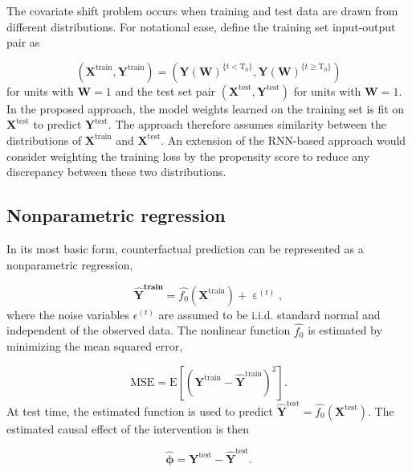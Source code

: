 \documentclass[hidelinks,12pt]{article}
\newcommand{\E}{\mathrm{E}}
\begin{document}
The covariate shift problem occurs when training and test data are drawn from different distributions. For notational ease, define the training set input-output pair as 

$$\left(\boldsymbol{X}^{\text{train}}, \boldsymbol{Y}^{\text{train}}\right) = \left(\boldsymbol{Y}(\boldsymbol{W})^{\{t < \text{T}_0\}}, \boldsymbol{Y}(\boldsymbol{W})^{\{t \geq \text{T}_0\}}\right)$$
\noindent
for units with $\boldsymbol{W}=1$ and the test set pair $\left(\boldsymbol{X}^{\text{test}}, \boldsymbol{Y}^{\text{test}}\right)$ for units with $\boldsymbol{W}=1$. In the proposed approach, the model weights learned on the training set is fit on $\boldsymbol{X}^{\text{test}}$ to predict $\boldsymbol{Y}^{\text{test}}$. The approach therefore assumes similarity between the distributions of $\boldsymbol{X}^{\text{train}}$ and $\boldsymbol{X}^{\text{test}}$. An extension of the RNN-based approach would consider weighting the training loss by the propensity score to reduce any discrepancy between these two distributions. 

\subsection{Nonparametric regression}

In its most basic form, counterfactual prediction can be represented as a nonparametric regression,

\begin{equation}\label{eq:np}
  \boldsymbol{\hat{\boldsymbol{Y}}^{\text{train}}} =  \hat{f_0} \left(\boldsymbol{X}^{\text{train}}\right) + \upepsilon^{(t)},
\end{equation}
\noindent
where the noise variables $\epsilon^{(t)}$ are assumed to be i.i.d. standard normal and independent of the observed data. The nonlinear function $\hat{f_0}$ is estimated by minimizing the mean squared error, 

\begin{equation} \label{eq:mse}
\text{MSE} = \E \left[\left(\boldsymbol{Y}^{\text{train}} - \boldsymbol{\hat{Y}}^{\text{train}}  \right)^2 \right].
\end{equation}
\noindent
At test time, the estimated function is used to predict $\boldsymbol{\hat{Y}}^{\text{test}} = \hat{f_0} \left(\boldsymbol{X}^{\text{test}}\right)$. The estimated causal effect of the intervention is then

\begin{equation}\label{eq:pointwise}
  \boldsymbol{\hat{\phi}} = \boldsymbol{Y}^{\text{test}} - \boldsymbol{\hat{Y}}^{\text{test}}. 
\end{equation}
\end{document}
